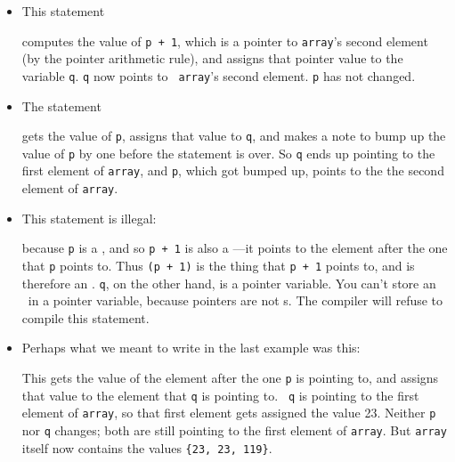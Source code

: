 \begin{itemize}
\item This statement
\begin{flushleft}
\verb% q = p + 1; % 
\end{flushleft}

computes the value of {\tt p + 1}, which is a pointer to {\tt array}'s
second element (by the pointer arithmetic rule), and assigns that
pointer value to the variable {\tt q}.  {\tt q} now points to {\tt
array}'s second element.  {\tt p} has not changed.

\item The statement
\begin{flushleft}
\verb% q = p++; % 
\end{flushleft}

gets the value of {\tt p}, assigns that value to {\tt q}, and makes a
note to bump up the value of {\tt p} by one before the statement is
over.  So {\tt q} ends up pointing to the first element of {\tt array},
and {\tt p}, which got bumped up, points to the the second element of
{\tt array}.

\item This statement is illegal:

\begin{flushleft}
\verb% q = *(p + 1);%
\end{flushleft}

\noindent because {\tt p} is a \Int, and so {\tt p + 1} is also a
\Int---it points to the element after the one that {\tt p} points to.
Thus \mbox{\tt *(p + 1)} is the thing that \mbox{\tt p + 1} points to, and is
therefore an \int.  {\tt q}, on the other hand, is a pointer variable.
You can't store an \int\ in a pointer variable, because pointers are not
\int s. The compiler will refuse to compile this statement.

\item Perhaps what we meant to write in the last example was this:

\begin{flushleft}
\verb% *q = *(p + 1);% \\*
\end{flushleft}

This gets the value of the element after the one {\tt p} is pointing to,
and assigns that value to the element that {\tt q} is pointing to.  {\tt
q} is pointing to the first element of {\tt array}, so that first element
gets assigned the value 23. Neither {\tt p} nor {\tt q} changes; both
are still pointing to the first element of {\tt array}.  But {\tt array}
itself now contains the values {\tt \{23, 23, 119\}}.  


\end{itemize}
